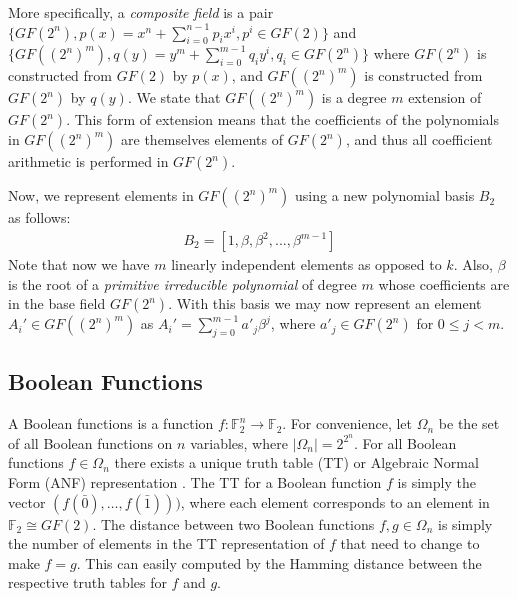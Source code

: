 More specifically, a \emph{composite field} is a pair $\{GF(2^n), p(x) = x^n + \sum_{i=0}^{n-1}p_ix^i, p^i \in GF(2)\}$ and $\{GF((2^n)^m), q(y) = y^m + \sum_{i=0}^{m-1}q_iy^i, q_i \in GF(2^n)\}$ where $GF(2^n)$ is constructed from $GF(2)$ by $p(x)$, and $GF((2^n)^m)$ is constructed from $GF(2^n)$ by $q(y)$. We state that $GF((2^n)^m)$ is a degree $m$ extension of $GF(2^n)$. This form of extension means that the coefficients of the polynomials in $GF((2^n)^m)$ are themselves elements of $GF(2^n)$, and thus all coefficient arithmetic is performed in $GF(2^n)$.

Now, we represent elements in $GF((2^n)^m)$ using a new polynomial basis $B_2$ as follows:
\begin{align*}
B_2 = [1, \beta, \beta^2,...,\beta^{m - 1}]
\end{align*}
Note that now we have $m$ linearly independent elements as opposed to $k$. Also, $\beta$ is the root of a \emph{primitive irreducible polynomial} of degree $m$ whose coefficients are in the base field $GF(2^n)$. With this basis we may now represent an element $A_i' \in GF((2^n)^m)$ as $A_i' = \sum_{j = 0}^{m - 1} a'_j \beta^j$, where $a'_j \in GF(2^n)$ for $0 \leq j < m$.

\subsection{Boolean Functions}
A Boolean functions is a function $f : \mathbb{F}_2^n \to \mathbb{F}_2$.
For convenience, let $\Omega_n$ be the set of all Boolean functions on $n$ variables, where $|\Omega_n| = 2^{2^{n}}$. For all Boolean functions $f \in \Omega_n$ there exists a
unique truth table (TT) or Algebraic Normal Form (ANF) representation \cite{cusik09-BooleanFunctions}. The TT for a Boolean function
$f$ is simply the vector $(f(\bar{0}), \dots, f(\bar{1})))$, where each element corresponds to an element
in $\mathbb{F}_2 \cong GF(2)$. The distance between two Boolean functions $f, g \in \Omega_n$ is simply the number of elements in the TT representation of $f$ that need to change to make $f = g$. This can easily computed by the Hamming distance between the respective truth tables for $f$ and $g$.

